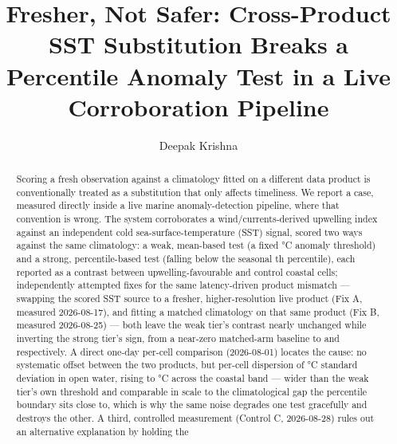 \documentclass[runningheads]{llncs}
\begin{document}
\title{Fresher, Not Safer: Cross-Product SST Substitution Breaks a Percentile
Anomaly Test in a Live Corroboration Pipeline}


\author{Deepak Krishna}

\maketitle

\begin{abstract}
Scoring a fresh observation against a climatology fitted on a different data
product is conventionally treated as a substitution that only affects
timeliness. We report a case, measured directly inside a live marine
anomaly-detection pipeline, where that convention is wrong. The system
corroborates a wind/currents-derived upwelling index against an independent
cold sea-surface-temperature (SST) signal, scored two ways against the same
climatology: a weak, mean-based test (a fixed \CoolAnomalyThreshold{}\si{\celsius}
anomaly threshold) and a strong, percentile-based test (falling below the
seasonal \ClimPercentile{}th percentile), each reported as a contrast between
upwelling-favourable and control coastal cells; \NCrossProductFixes{}
independently attempted fixes for the same latency-driven product mismatch
--- swapping the scored SST source to a fresher, higher-resolution live
product (Fix A, measured 2026-08-17), and fitting a matched climatology on
that same product (Fix B, measured 2026-08-25) --- both leave the weak
tier's contrast nearly unchanged while inverting the strong tier's sign, from
a near-zero matched-arm baseline to \FixAStrongLive{} and \FixBStrongGlorys{}
respectively. A direct one-day per-cell comparison (2026-08-01) locates the
cause: no systematic offset between the two products, but per-cell dispersion
of \DisagOpenSD{}\si{\celsius} standard deviation in open water, rising to
\DisagCoastalSD{}\si{\celsius} across the coastal band --- wider than the weak
tier's own threshold and comparable in scale to the climatological gap the
percentile boundary sits close to, which is why the same noise degrades one
test gracefully and destroys the other. A third, controlled measurement
(Control C, 2026-08-28) rules out an alternative explanation by holding the

\end{abstract}
\end{document}
